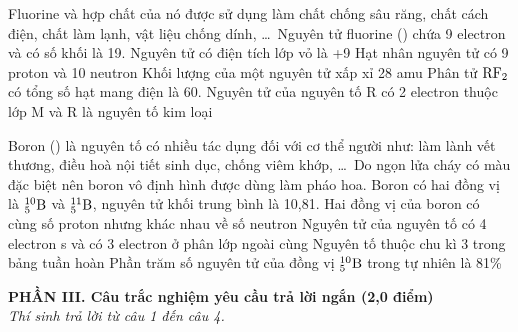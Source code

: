 \documentclass[11pt,a4paper]{article}
\begin{document}
\begin{ex}
Fluorine và hợp chất của nó được sử dụng làm chất chống sâu răng, chất cách điện, chất làm lạnh, vật liệu chống dính, \dots\ Nguyên tử fluorine () chứa 9 electron và có số khối là 19.
\choiceTF
{Nguyên tử  có điện tích lớp vỏ là +9}
{\True Hạt nhân nguyên tử  có 9 proton và 10 neutron}
{Khối lượng của một nguyên tử  xấp xỉ 28 amu}
{\True Phân tử $\ce{RF2}$ có tổng số hạt mang điện là 60. Nguyên tử của nguyên tố R có 2 electron thuộc lớp M và R là nguyên tố kim loại}

\end{ex}
\begin{ex}
Boron () là nguyên tố có nhiều tác dụng đối với cơ thể người như: làm lành vết thương, điều hoà nội tiết sinh dục, chống viêm khớp, \dots\ Do ngọn lửa cháy có màu đặc biệt nên boron vô định hình được dùng làm pháo hoa. Boron có hai đồng vị là $^{10}_5\ce{B}$ và $^{11}_5\ce{B}$, nguyên tử khối trung bình là 10,81.
\choiceTF
{\True Hai đồng vị của boron có cùng số proton nhưng khác nhau về số neutron}
{Nguyên tử của nguyên tố  có 4 electron s và có 3 electron ở phân lớp ngoài cùng}
{Nguyên tố  thuộc chu kì 3 trong bảng tuần hoàn}
{Phần trăm số nguyên tử của đồng vị $^{10}_5\ce{B}$ trong tự nhiên là 81\%}

\end{ex}
\vspace{4pt}
\noindent
{\color{mainGreen}\textbf{\large PHẦN III. Câu trắc nghiệm yêu cầu trả lời ngắn (2,0 điểm)}}\\
\textit{\small Thí sinh trả lời từ câu 1 đến câu 4.}
\vspace{2pt}
\end{document}
